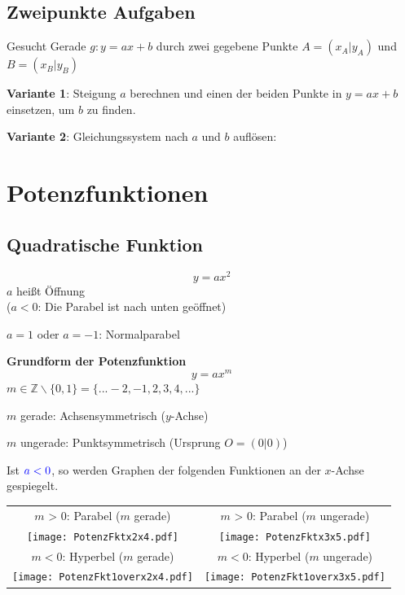\begin{multicols}{2}
\subsection*{Zweipunkte Aufgaben}
Gesucht Gerade $g: y=ax+b$ durch zwei gegebene Punkte $A=(x_A|y_A)$
und $B=(x_B|y_B)$

\textbf{Variante 1}: Steigung $a$ berechnen und einen der beiden Punkte in
$y=ax+b$ einsetzen, um $b$ zu finden.

\textbf{Variante 2}: Gleichungssystem nach $a$ und $b$ auf\/lösen:


\forceCB
\section*{Potenzfunktionen}

\subsection*{Quadratische Funktion}
$$y=ax^2$$
$a$ heißt Öffnung\\
($a<0$: Die Parabel ist nach unten geöffnet)

$a=1$ oder $a=-1$: Normalparabel
\vspace*{\fill}

\begin{tcolorbox}[colback=white]
  \textbf{Grundform der Potenzfunktion}
$$y=ax^m$$
$m\in\mathbb{Z}\backslash\{0,1\} = \{...-2, -1, 2, 3, 4, ...\}$
\end{tcolorbox}

$m$ gerade: Achsensymmetrisch ($y$-Achse)

$m$ ungerade: Punktsymmetrisch (Ursprung $O=(0|0)$)


Ist ${\color{blue}a<0}$, so werden Graphen der folgenden Funktionen an der $x$-Achse gespiegelt.

\end{multicols}

\begin{tabular}{cc}
$m$ > 0: Parabel ($m$ gerade) & $m$ > 0: Parabel ($m$ ungerade)\\   %
  \texttt{[image: PotenzFktx2x4.pdf]} &
  \texttt{[image: PotenzFktx3x5.pdf]}\\

$m<0$: Hyperbel  ($m$ gerade) & $m<0$: Hyperbel ($m$ ungerade)\\
  \texttt{[image: PotenzFkt1overx2x4.pdf]}&
  \texttt{[image: PotenzFkt1overx3x5.pdf]}
  \end{tabular}

